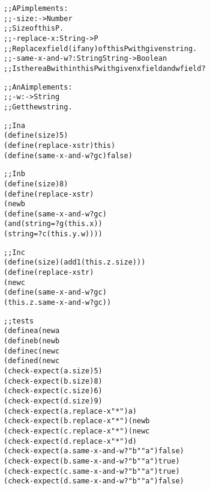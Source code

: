 \documentclass[12pt]{article}                   %
\newenvironment{solution}{\color{Red}}{}
\begin{document}
\begin{problem}
\newpage
\ifrubric{}
\newpage
\fi

\begin{solution}
\begin{alltt}
;; A P implements:
;; - size : -> Number
;;   Size of this P.
;; - replace-x : String -> P
;;   Replace x field (if any) of this P with given string.
;; - same-x-and-w? : String String -> Boolean
;;   Is there a B within this P with given x field and w field?

;; An A implements:
;; - w : -> String
;;   Get the w string.

;; In a%: 
(define (size) 5)
(define (replace-x str) this)
(define (same-x-and-w? g c) false)

;; In b%:
(define (size) 8)
(define (replace-x str)
  (new b% str (this . y)))
(define (same-x-and-w? g c)
  (and (string=? g (this . x))
       (string=? c (this . y . w))))

;; In c%:
(define (size) (add1 (this . z . size)))
(define (replace-x str)
  (new c% (this . z . replace-x str)))
(define (same-x-and-w? g c)
  (this . z . same-x-and-w? g c))

;; tests
(define a (new a% "a"))
(define b (new b% "b" a))
(define c (new c% b))
(define d (new c% a))
(check-expect (a . size) 5)
(check-expect (b . size) 8)
(check-expect (c . size) 6)
(check-expect (d . size) 9)
(check-expect (a . replace-x "*") a)
(check-expect (b . replace-x "*") (new b% "*" a))
(check-expect (c . replace-x "*") (new c% (new b% "*" a)))
(check-expect (d . replace-x "*") d)
(check-expect (a . same-x-and-w? "b" "a") false)
(check-expect (b . same-x-and-w? "b" "a") true)
(check-expect (c . same-x-and-w? "b" "a") true)
(check-expect (d . same-x-and-w? "b" "a") false)
\end{alltt}
\end{solution}
\end{problem}
\newpage
\end{document}
